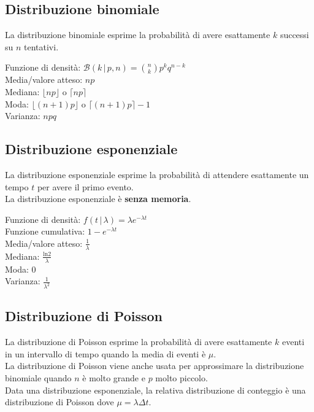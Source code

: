 \documentclass[10pt,landscape]{article}
\begin{document}
\begin{multicols}{3}
\subsection{Distribuzione binomiale}
La distribuzione binomiale esprime la probabilità di avere esattamente $k$ successi su $n$ tentativi. \\

\vspace{1em}

Funzione di densità: $\mathcal{B}(k \, | \, p, n) = \binom{n}{k}p^{k}q^{n-k}$ \\
Media/valore atteso: $np$ \\
Mediana: $\lfloor np \rfloor$ o $\lceil np \rceil$ \\
Moda: $\lfloor (n+1)p \rfloor$ o $\lceil (n+1)p \rceil -1$ \\
Varianza: $npq$ \\

\subsection{Distribuzione esponenziale}
La distribuzione esponenziale esprime la probabilità di attendere esattamente un tempo $t$ per avere il primo evento. \\
La distribuzione esponenziale è \textbf{senza memoria}. \\

\vspace{1em}

Funzione di densità: $f(t \, | \, \lambda) = \lambda e^{-\lambda t}$ \\
Funzione cumulativa: $1 - e^{-\lambda t}$ \\
Media/valore atteso: $\frac{1}{\lambda}$ \\
Mediana: $\frac{\text{ln} 2}{\lambda}$ \\
Moda: $0$ \\
Varianza: $\frac{1}{\lambda^2}$ \\

\subsection{Distribuzione di Poisson}
La distribuzione di Poisson esprime la probabilità di avere esattamente $k$ eventi in un intervallo di tempo quando la media di eventi è $\mu$. \\
La distribuzione di Poisson viene anche usata per approssimare la distribuzione binomiale quando $n$ è molto grande e $p$ molto piccolo. \\
Data una distribuzione esponenziale, la relativa distribuzione di conteggio è una distribuzione di Poisson dove $\mu = \lambda \Delta t$.


\end{multicols}
\end{document}
